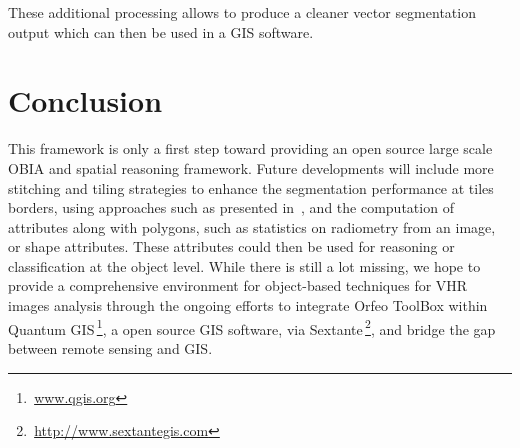 \documentclass{josis}
\newcommand{\furl}[1]{$\,$\footnote{$\,$\url{#1}}}
\begin{document}
These additional processing allows to produce a cleaner vector
segmentation output which can then be used in a GIS software.

\section{Conclusion}

This framework is only a first step toward providing an open source
large scale OBIA and spatial reasoning framework. Future developments
will include more stitching and tiling strategies to enhance the
segmentation performance at tiles borders, using approaches such as
presented in~\cite{crisp2003fast}, and the computation of attributes
along with polygons, such as statistics on radiometry from an image,
or shape attributes. These attributes could then be used for reasoning
or classification at the object level. While there is still a lot
missing, we hope to provide a comprehensive environment for
object-based techniques for VHR images analysis through the ongoing
efforts to integrate Orfeo ToolBox within Quantum
GIS\furl{www.qgis.org}, a open source GIS software, via
Sextante\furl{http://www.sextantegis.com}, and bridge the
gap between remote sensing and GIS.



\end{document}
